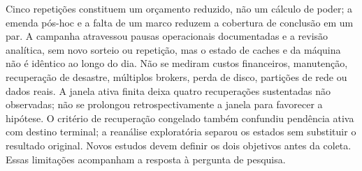 Cinco repetições constituem um orçamento reduzido, não um cálculo de poder; a emenda pós-hoc e a falta de um marco reduzem a cobertura de conclusão em um par. A campanha atravessou pausas operacionais documentadas e a revisão analítica, sem novo sorteio ou repetição, mas o estado de caches e da máquina não é idêntico ao longo do dia. Não se mediram custos financeiros, manutenção, recuperação de desastre, múltiplos brokers, perda de disco, partições de rede ou dados reais. A janela ativa finita deixa quatro recuperações sustentadas não observadas; não se prolongou retrospectivamente a janela para favorecer a hipótese. O critério de recuperação congelado também confundiu pendência ativa com destino terminal; a reanálise exploratória separou os estados sem substituir o resultado original. Novos estudos devem definir os dois objetivos antes da coleta. Essas limitações acompanham a resposta à pergunta de pesquisa.








